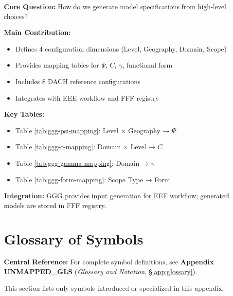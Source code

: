 \begin{tcolorbox}[colback=green!10!white, colframe=green!75!black,
    title=\textbf{Appendix UNMAPPED_CFG: Summary}]

\textbf{Core Question:} How do we generate model specifications from high-level choices?

\textbf{Main Contribution:}
\begin{itemize}[nosep]
    \item Defines 4 configuration dimensions (Level, Geography, Domain, Scope)
    \item Provides mapping tables for $\Psi$, $C$, $\gamma$, functional form
    \item Includes 8 DACH reference configurations
    \item Integrates with EEE workflow and FFF registry
\end{itemize}

\textbf{Key Tables:}
\begin{itemize}[nosep]
    \item Table \ref{tab:ggg-psi-mapping}: Level × Geography → $\Psi$
    \item Table \ref{tab:ggg-c-mapping}: Domain × Level → $C$
    \item Table \ref{tab:ggg-gamma-mapping}: Domain → $\gamma$
    \item Table \ref{tab:ggg-form-mapping}: Scope Type → Form
\end{itemize}

\textbf{Integration:} GGG provides input generation for EEE workflow;
generated models are stored in FFF registry.

\end{tcolorbox}


\section{Glossary of Symbols}
\label{sec:ggg-glossary}

\begin{tcolorbox}[colback=blue!5!white, colframe=blue!75!black]
\textbf{Central Reference:} For complete symbol definitions, see
\textbf{Appendix UNMAPPED_GLS} (\textit{Glossary and Notation}, \S\ref{app:glossary}).

This section lists only symbols introduced or specialized in this appendix.
\end{tcolorbox}

